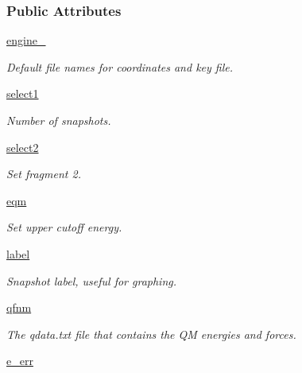 \subsubsection*{Public Attributes}
\begin{DoxyCompactItemize}
\item 
\hyperlink{classforcebalance_1_1tinkerio_1_1Interaction__TINKER_a3b60da004bb9a53ac3d46943e0ddef69}{engine\-\_\-}
\begin{DoxyCompactList}\small\item\em Default file names for coordinates and key file. \end{DoxyCompactList}\item 
\hyperlink{classforcebalance_1_1interaction_1_1Interaction_a22c4a698eb3bf91187894fdce874e8d5}{select1}
\begin{DoxyCompactList}\small\item\em Number of snapshots. \end{DoxyCompactList}\item 
\hyperlink{classforcebalance_1_1interaction_1_1Interaction_acbdfffa2596af6c90adf0bfe071d2205}{select2}
\begin{DoxyCompactList}\small\item\em Set fragment 2. \end{DoxyCompactList}\item 
\hyperlink{classforcebalance_1_1interaction_1_1Interaction_a4e609a6bd7e9a0852622ecc4ca5537d1}{eqm}
\begin{DoxyCompactList}\small\item\em Set upper cutoff energy. \end{DoxyCompactList}\item 
\hyperlink{classforcebalance_1_1interaction_1_1Interaction_a35a5c40d99a474bbf6032888f1f75e46}{label}
\begin{DoxyCompactList}\small\item\em Snapshot label, useful for graphing. \end{DoxyCompactList}\item 
\hyperlink{classforcebalance_1_1interaction_1_1Interaction_a6b49404cbea9c353fc4b97506ff143c6}{qfnm}
\begin{DoxyCompactList}\small\item\em The qdata.\-txt file that contains the Q\-M energies and forces. \end{DoxyCompactList}\item 
\hyperlink{classforcebalance_1_1interaction_1_1Interaction_a1577e34cd7031365ade75a2a56ec9b0d}{e\-\_\-err}

\end{DoxyCompactItemize}
